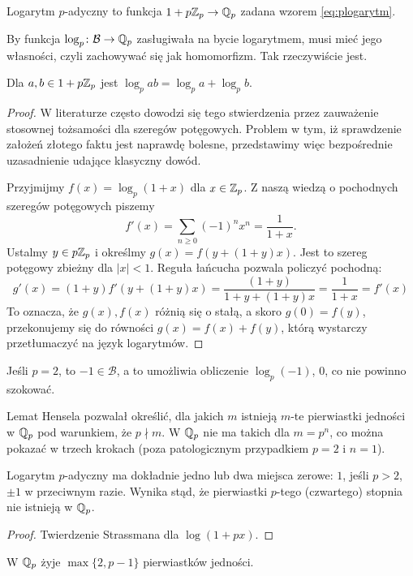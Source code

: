 \begin{definicja}
	Logarytm $p$-adyczny to funkcja $1 + p\mathbb Z_p \to \mathbb Q_p$ zadana wzorem \ref{eq:plogarytm}.
\end{definicja}

By funkcja $\log_p \colon \mathcal B \to \mathbb Q_p$ zasługiwała na bycie logarytmem, musi mieć jego własności, czyli zachowywać się jak homomorfizm.
Tak rzeczywiście jest.

\begin{fakt}
	Dla $a, b \in 1+p\mathbb Z_p$ jest $\log_p ab = \log_p a + \log_p b$.
\end{fakt}

\begin{proof}
	W literaturze często dowodzi się tego stwierdzenia przez zauważenie stosownej tożsamości dla szeregów potęgowych.
	Problem w tym, iż sprawdzenie założeń złotego faktu jest naprawdę bolesne, przedstawimy więc bezpośrednie uzasadnienie udające klasyczny dowód.

	Przyjmijmy $f(x) = \log_p(1+x)$ dla $x \in \mathbb Z_p$.
	Z naszą wiedzą o pochodnych szeregów potęgowych piszemy
	\[
		f'(x) = \sum_{n \ge 0} (-1)^nx^n = \frac{1}{1+x}.
	\]
	Ustalmy $y \in p\mathbb Z_p$ i określmy $g(x) = f(y + (1+y)x)$.
	Jest to szereg potęgowy zbieżny dla $|x| < 1$.
	Reguła łańcucha pozwala policzyć pochodną:
	\[
		g'(x) = (1+y) f'(y + (1+y)x) = \frac{(1+y)}{1+y + (1+y)x}  = \frac{1}{1+x} = f'(x)
	\]
	To oznacza, że $g(x), f(x)$ różnią się o stałą, a skoro $g(0) = f(y)$, przekonujemy się do równości $g(x) = f(x) + f(y)$, którą wystarczy przetłumaczyć na język logarytmów.
\end{proof}

Jeśli $p = 2$, to $-1 \in \mathcal B$, a to umożliwia obliczenie $\log_p(-1)$, $0$, co nie powinno szokować.

Lemat Hensela pozwalał określić, dla jakich $m$ istnieją $m$-te pierwiastki jedności w $\mathbb Q_p$ pod warunkiem, że $p \nmid m$.
W $\mathbb Q_p$ nie ma takich dla $m = p^n$, co można pokazać w trzech krokach (poza patologicznym przypadkiem $p = 2$ i $n = 1$).

\begin{fakt}
	Logarytm $p$-adyczny ma dokładnie jedno lub dwa miejsca zerowe: $1$, jeśli $p > 2$, $\pm 1$ w przeciwnym razie.
	Wynika stąd, że pierwiastki $p$-tego (czwartego) stopnia nie istnieją w $\mathbb Q_p$.
\end{fakt}

\begin{proof}
	Twierdzenie Strassmana dla $\log(1+px)$.
\end{proof}

\begin{wniosek}
	W $\mathbb Q_p$ żyje $\max\{2, p - 1\}$ pierwiastków jedności.
\end{wniosek}